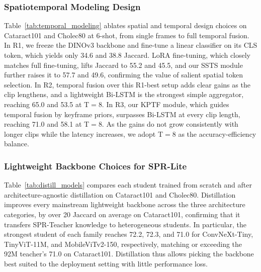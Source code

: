 



\subsubsection{Spatiotemporal Modeling Design}
Table~\ref{tab:temporal_modeling} ablates spatial and temporal design choices on
Cataract101 and Cholec80 at 6-shot, from single frames to full temporal fusion.
In R1, we freeze the DINOv3 backbone and fine-tune a linear classifier on its CLS
token, which yields only 34.6 and 38.8 Jaccard.
LoRA fine-tuning, which closely matches full fine-tuning, lifts
Jaccard to 55.2 and 45.5, and our SSTS module further raises it to 57.7 and 49.6,
confirming the value of salient spatial token selection.
In R2, temporal fusion over this R1-best setup adds clear gains as the clip lengthens,
and a lightweight Bi-LSTM is the strongest simple aggregator, reaching 65.0 and 53.5
at T$=$8.
In R3, our KPTF module, which guides temporal fusion by keyframe priors, surpasses
Bi-LSTM at every clip length, reaching 71.0 and 58.1 at T$=$8.
As the gains do not grow consistently with longer clips while the latency
increases, we adopt T$=$8 as the accuracy-efficiency balance.



\subsubsection{Lightweight Backbone Choices for SPR-Lite}
Table~\ref{tab:distill_models} compares each student trained from scratch and after
architecture-agnostic distillation on Cataract101 and Cholec80.
Distillation improves every mainstream lightweight backbone across the three
architecture categories, by over 20 Jaccard on average on Cataract101, confirming
that it transfers SPR-Teacher knowledge to heterogeneous students.
In particular, the strongest student of each family reaches 72.2, 72.3, and 71.0 for
ConvNeXt-Tiny, TinyViT-11M, and MobileViTv2-150, respectively, matching or exceeding
the 92M teacher's 71.0 on Cataract101.
Distillation thus allows picking the backbone best suited to the deployment
setting with little performance loss.

